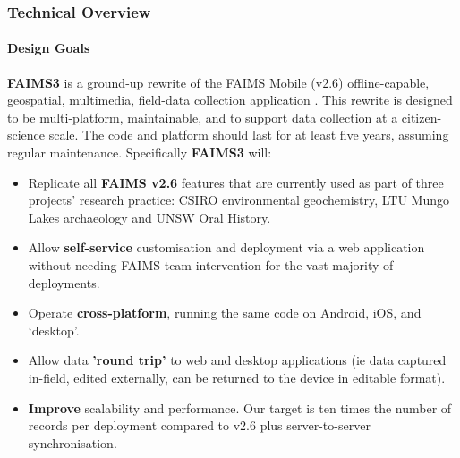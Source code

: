 \documentclass[
	aspectratio=169, %
	11pt, %
	t, %
]{beamer}
\begin{document}
\begin{frame}%
	\frametitle{Technical Overview}
    \framesubtitle{Design Goals}
    \textbf{FAIMS3} is a ground-up rewrite of the \href{https://github.com/FAIMS}{FAIMS Mobile (v2.6)} offline-capable, geospatial, multimedia, field-data collection application %
    . This rewrite is designed to be multi-platform, maintainable, and to support data collection at a citizen-science scale. The code and platform should last for at least five years, assuming regular maintenance.  Specifically \textbf{FAIMS3} will:
    
    \begin{itemize}
        \item Replicate all\textbf{ FAIMS v2.6} features that are currently used as part of three projects' research practice: CSIRO environmental geochemistry, LTU Mungo Lakes archaeology and UNSW Oral History. 
        \item Allow \textbf{self-service} customisation and deployment via a web application without needing FAIMS team intervention for the vast majority of deployments.
        \item Operate \textbf{cross-platform}, running the same code on Android, iOS, and `desktop'.
        \item Allow data \textbf{'round trip'} to web and desktop applications (ie data captured in-field, edited externally, can be returned to the device in editable format).
        \item \textbf{Improve} scalability and performance. Our target is ten times the number of records per deployment compared to v2.6 plus server-to-server synchronisation. 
     \end{itemize}
     \medskip
\end{frame} 
\end{document}
